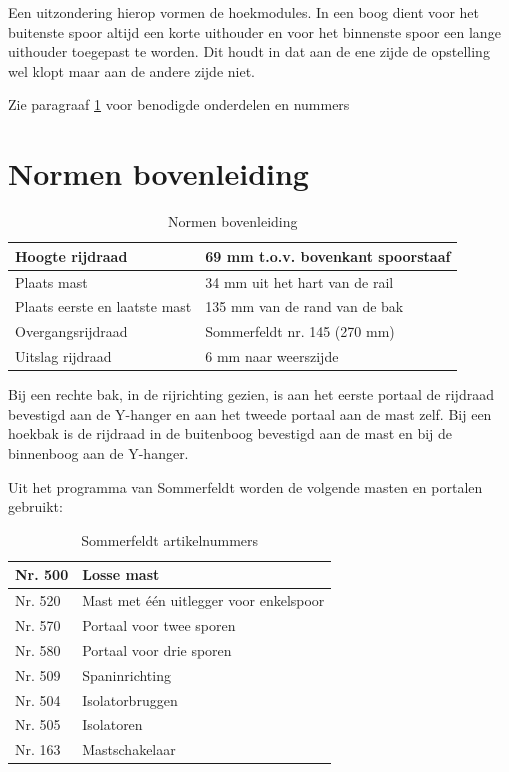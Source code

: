 \documentclass[12pt,a4paper]{report}
\begin{document}
Een uitzondering hierop vormen de hoekmodules. In een boog dient voor het buitenste spoor altijd een korte uithouder en voor het binnenste spoor een lange uithouder toegepast te worden. Dit houdt in dat aan de ene zijde de opstelling wel klopt maar aan de andere zijde niet.

Zie paragraaf \ref{ch:normen_bovenleiding} voor benodigde onderdelen en nummers

\section{Normen bovenleiding}
\label{ch:normen_bovenleiding}

\begin{table}[h!]
\begin{tabular}{| l | l |}
\hline
\cellcolor[gray]{0.84}Hoogte rijdraad&69 mm t.o.v. bovenkant spoorstaaf\\
\hline
\cellcolor[gray]{0.84}Plaats mast&34 mm uit het hart van de rail\\
\hline
\cellcolor[gray]{0.84}Plaats eerste en laatste mast&135 mm van de rand van de bak\\
\hline
\cellcolor[gray]{0.84}Overgangsrijdraad&Sommerfeldt nr. 145 (270 mm)\\
\hline
\cellcolor[gray]{0.84}Uitslag rijdraad&6 mm naar weerszijde\\
\hline
\end{tabular}
\caption{Normen bovenleiding}
\end{table}

Bij een rechte bak, in de rijrichting gezien, is aan het eerste portaal de rijdraad bevestigd aan de Y-hanger en aan het tweede portaal aan de mast zelf.
Bij een hoekbak is de rijdraad in de buitenboog bevestigd aan de mast en bij de binnenboog aan de Y-hanger.

Uit het programma van Sommerfeldt worden de volgende masten en portalen gebruikt:

\begin{table}[h!]
\begin{tabular}{| l |p{8cm}|}
\hline
\cellcolor[gray]{0.84}Nr. 500&Losse mast\\
\hline
\cellcolor[gray]{0.84}Nr. 520&Mast met \'{e}\'{e}n uitlegger voor enkelspoor\\
\hline
\cellcolor[gray]{0.84}Nr. 570&Portaal voor twee sporen\\
\hline
\cellcolor[gray]{0.84}Nr. 580&Portaal voor drie sporen\\
\hline
\cellcolor[gray]{0.84}Nr. 509&Spaninrichting\\
\hline
\cellcolor[gray]{0.84}Nr. 504&Isolatorbruggen\\
\hline
\cellcolor[gray]{0.84}Nr. 505&Isolatoren\\
\hline
\cellcolor[gray]{0.84}Nr. 163&Mastschakelaar\\
\hline
\end{tabular}
\caption{Sommerfeldt artikelnummers}
\end{table}
\end{document}
